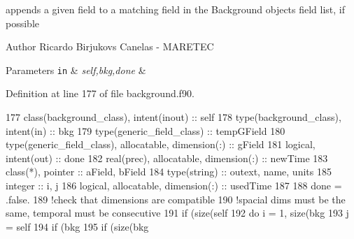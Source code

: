 appends a given field to a matching field in the Background object\textquotesingle{}s field list, if possible 

\begin{DoxyAuthor}{Author}
Ricardo Birjukovs Canelas -\/ M\+A\+R\+E\+T\+EC 
\end{DoxyAuthor}

\begin{DoxyParams}[1]{Parameters}
\mbox{\tt in}  & {\em self,bkg,done} & \\
\hline
\end{DoxyParams}


Definition at line 177 of file background.\+f90.


\begin{DoxyCode}
177     \textcolor{keywordtype}{class}(background\_class), \textcolor{keywordtype}{intent(inout)} :: self
178     \textcolor{keywordtype}{type}(background\_class), \textcolor{keywordtype}{intent(in)} :: bkg
179     \textcolor{keywordtype}{type}(generic\_field\_class) :: tempGField
180     \textcolor{keywordtype}{type}(generic\_field\_class), \textcolor{keywordtype}{allocatable}, \textcolor{keywordtype}{dimension(:)} :: gField
181     \textcolor{keywordtype}{logical}, \textcolor{keywordtype}{intent(out)} :: done
182     \textcolor{keywordtype}{real(prec)}, \textcolor{keywordtype}{allocatable}, \textcolor{keywordtype}{dimension(:)} :: newTime
183     \textcolor{keywordtype}{class}(*), \textcolor{keywordtype}{pointer} :: aField, bField
184     \textcolor{keywordtype}{type}(string) :: outext, name, units
185     \textcolor{keywordtype}{integer} :: i, j
186     \textcolor{keywordtype}{logical}, \textcolor{keywordtype}{allocatable}, \textcolor{keywordtype}{dimension(:)} :: usedTime
187 
188     done = .false.
189     \textcolor{comment}{!check that dimensions are compatible}
190     \textcolor{comment}{!spacial dims must be the same, temporal must be consecutive}
191     \textcolor{keywordflow}{if} (\textcolor{keyword}{size}(self%
192         \textcolor{keywordflow}{do} i = 1, \textcolor{keyword}{size}(bkg%
193             j = self%
194             \textcolor{keywordflow}{if} (bkg%
195                 \textcolor{keywordflow}{if} (\textcolor{keyword}{size}(bkg%

\end{DoxyCode}
